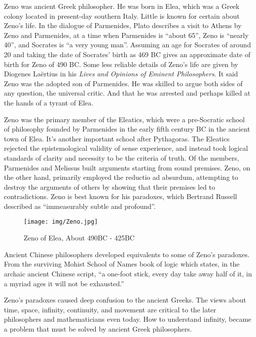 \documentclass{article}
\begin{document}
Zeno was ancient Greek philosopher. He was born in Elea, which was a Greek colony located in present-day southern Italy. Little is known for certain about Zeno's life. In the dialogue of Parmenides, Plato describes a visit to Athens by Zeno and Parmenides, at a time when Parmenides is ``about 65'', Zeno is ``nearly 40'', and Socrates is ``a very young man''. Assuming an age for Socrates of around 20 and taking the date of Socrates' birth as 469 BC gives an approximate date of birth for Zeno of 490 BC. Some less reliable details of Zeno's life are given by Diogenes Laërtius in his {\em Lives and Opinions of Eminent Philosophers}. It said Zeno was the adopted son of Parmenides. He was skilled to argue both sides of any question, the universal critic. And that he was arrested and perhaps killed at the hands of a tyrant of Elea\cite{HanXueTao16}.

Zeno was the primary member of the Eleatics, which were a pre-Socratic school of philosophy founded by Parmenides in the early fifth century BC in the ancient town of Elea. It's another important school after Pythagoras. The Eleatics rejected the epistemological validity of sense experience, and instead took logical standards of clarity and necessity to be the criteria of truth. Of the members, Parmenides and Melissus built arguments starting from sound premises. Zeno, on the other hand, primarily employed the reductio ad absurdum, attempting to destroy the arguments of others by showing that their premises led to contradictions. Zeno is best known for his paradoxes, which Bertrand Russell described as ``immeasurably subtle and profound''.

\begin{figure}[htbp]
 \centering
 \texttt{[image: img/Zeno.jpg]}
 \captionsetup{labelformat=empty}
 \caption{Zeno of Elea, About 490BC - 425BC}
 \label{fig:Zeno-of-Elea}
\end{figure}

Ancient Chinese philosophers developed equivalents to some of Zeno's paradoxes. From the surviving Mohist School of Names book of logic which states, in the archaic ancient Chinese script, ``a one-foot stick, every day take away half of it, in a myriad ages it will not be exhausted.''

Zeno's paradoxes caused deep confusion to the ancient Greeks. The views about time, space, infinity, continuity, and movement are critical to the later philosophers and mathematicians even today. How to understand infinity, became a problem that must be solved by ancient Greek philosophers.
\end{document}
